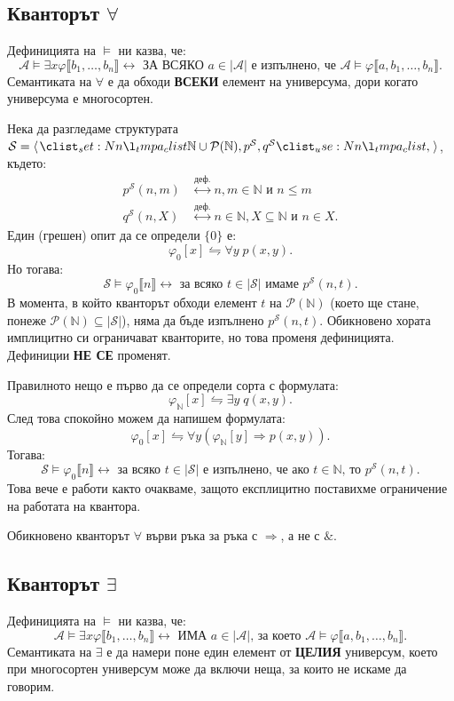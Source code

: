 \documentclass[12pt]{article}
\newcommand{\N}{\mathbb{N}}
\newcommand{\calA}{\mathcal{A}}
\newcommand{\calS}{\mathcal{S}}
\newcommand{\calP}{\mathcal{P}}
\newcommand{\dequiv}{\stackrel{\text{деф.}}{\longleftrightarrow}}
\newcommand{\db}[1]{\llbracket #1 \rrbracket}
\theoremstyle{definition}
\begin{document}
\subsection*{Кванторът $\forall$}

Дефиницията на $\models$ ни казва, че:
\[
  \calA \models \exists x \varphi \db{b_1, \dots, b_n} \longleftrightarrow \textbf{ ЗА ВСЯКО } a \in |\calA| \text{ е изпълнено, че } \calA \models \varphi \db{a, b_1, \dots, b_n}.
\]
Семантиката на $\forall$ е да обходи \textbf{ВСЕКИ} елемент на универсума, дори когато универсума е многосортен.

Нека да разгледаме структурата $\calS = \opair{ \N \cup \calP(\N), p^\calS, q^\calS}$, където:
\begin{align*}
  p^\calS(n, m) & \dequiv n, m \in \N \text{ и } n \leq m \\ 
  q^\calS(n, X) & \dequiv n \in \N, X \subseteq \N \text{ и } n \in X.
\end{align*}
Един (грешен) опит да се определи $\{ 0 \}$ е:
\[
  \varphi_0[x] \leftrightharpoons \forall y \; p(x, y).
\]
Но тогава:
\[
\calS \models \varphi_0\db{n} \longleftrightarrow \text{ за всяко } t \in |\calS| \text{ имаме } p^\calS(n, t).
\]
В момента, в който кванторът обходи елемент $t$ на $\calP(\N)$ (което ще стане, понеже $\calP(\N) \subseteq |\calS|$), няма да бъде изпълнено $p^\calS(n, t)$.
Обикновено хората имплицитно си ограничават кванторите, но това променя дефиницията.
Дефиниции \textbf{НЕ СЕ} променят.

Правилното нещо е първо да се определи сорта с формулата:
\[
  \varphi_\N[x] \leftrightharpoons \exists y \; q(x, y).
\]
След това спокойно можем да напишем формулата:
\[
  \varphi_0[x] \leftrightharpoons \forall y (\varphi_\N[y] \Rightarrow p(x, y)).
\]
Тогава:
\[
  \calS \models \varphi_0\db{n} \longleftrightarrow \text{ за всяко } t \in |\calS| \text{ е изпълнено, че ако } t \in \N \text{, то } p^\calS(n, t).
\]
Това вече е работи както очакваме, защото експлицитно поставихме ограничение на работата на квантора.

Обикновено кванторът $\forall$ върви ръка за ръка с $\Rightarrow$, а не с $\&$.

\subsection*{Кванторът $\exists$}

Дефиницията на $\models$ ни казва, че:
\[
  \calA \models \exists x \varphi \db{b_1, \dots, b_n} \longleftrightarrow \textbf{ ИМА } a \in |\calA| \text{, за което } \calA \models \varphi \db{a, b_1, \dots, b_n}.
\]
Семантиката на $\exists$ е да намери поне един елемент от \textbf{ЦЕЛИЯ} универсум, което при многосортен универсум може да включи неща, за които не искаме да говорим.
\end{document}
